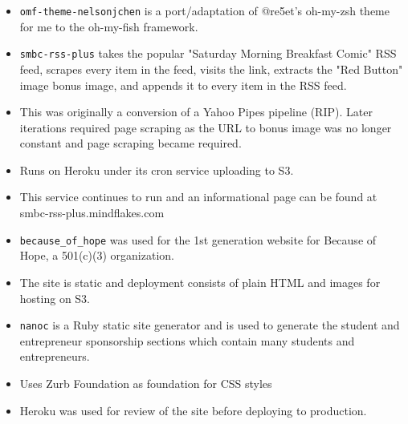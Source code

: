 \documentclass[10pt,letter,ragged2e]{altacv}
\begin{document}
\begin{paracol}{2}
\begin{itemize}
\item \texttt{omf-theme-nelsonjchen} is a port/adaptation of @re5et's oh-my-zsh theme for me to the oh-my-fish framework.
\end{itemize}

\divider


\begin{itemize}
\item \texttt{smbc-rss-plus} takes the popular "Saturday Morning Breakfast Comic" RSS feed, scrapes every item in the feed, visits the link, extracts the "Red Button" image bonus image, and appends it to every item in the RSS feed.
\item This was originally a conversion of a Yahoo Pipes pipeline (RIP). Later iterations required page scraping as the URL to bonus image was no longer constant and page scraping became required.
\item Runs on Heroku under its cron service uploading to S3.
\item This service continues to run and an informational page can be found at smbc-rss-plus.mindflakes.com
\end{itemize}

\divider


\begin{itemize}
\item \texttt{because\_of\_hope} was used for the 1st generation website for Because of Hope, a 501(c)(3) organization.
\item The site is static and deployment consists of plain HTML and images for hosting on S3.
\item \texttt{nanoc} is a Ruby static site generator and is used to generate the student and entrepreneur sponsorship sections which contain many students and entrepreneurs.
\item Uses Zurb Foundation as foundation for CSS styles
\item Heroku was used for review of the site before deploying to production.
\end{itemize}

\divider



\end{paracol}
\end{document}
